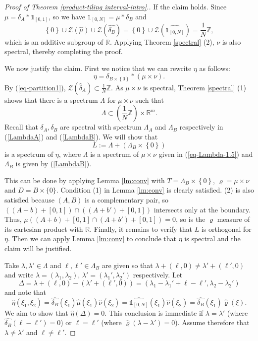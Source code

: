 \documentclass[reqno,a4paper,12pt]{amsart}
\numberwithin{equation}{section}
\newcommand{\R}{{\mathbb R}}
\newcommand{\Set}[1]{{\left\{{#1}\right\}}}
\newcommand{\RR}{{\mathbb R}}
\newcommand{\ZZ}{{\mathbb Z}}
\newcommand{\ft}[1]{\widehat{#1}}
\newcounter{rem}
\theoremstyle{remark}
\numberwithin{equation}{section}
\def\R{\mathbb{R}}
\begin{document}
{\begin{proof}[Proof of Theorem \ref{product-tiling interval-intro}.]
\noindent If the claim holds. Since $\mu = \delta_A\ast\mathds{1}_{[0, 1]}$, so we have $\mathds{1}_{[0, N]} = \mu*\delta_B$  and
$$
\Set{0} \cup \mathcal{Z}(\ft\mu) \cup \mathcal{Z}(\ft{\delta_B}) = \Set{0} \cup \mathcal{Z}(\ft{\mathds{1}_{[0, N]}}) = \frac1N\ZZ,
$$
{which is an additive subgroup of $\RR$.
Applying Theorem \ref{spectral} (2), $\nu$ is also spectral, thereby completing the proof.}


We now justify the claim. First we notice that we can rewrite $\eta$ as follows:
$$
\eta = \delta_{B\times\Set{0}}*(\mu\times\nu).
$$
By (\ref{eq-partition1}), ${\mathcal Z}(\widehat{\delta}_A) \subset \frac{1}{N}\ZZ$. As $\mu\times \nu$ is spectral,  Theorem \ref{spectral} (1) shows that   there is a spectrum $\Lambda$ for 
$\mu\times\nu$ such that  
\begin{equation}\label{eq-Lambda-1.5}
\Lambda\subset (\frac1N\ZZ) \times \RR^m.
\end{equation}
Recall that $\delta_A,\delta_B$ are spectral with spectrum $\Lambda_A$ and $\Lambda_B$ respectively in (\ref{LambdaA}) and (\ref{LambdaB}). 
We will show that
$$
L := \Lambda+(\Lambda_B\times\Set{0})
$$
is a spectrum of $\eta$, where $\Lambda$ is a spectrum of $\mu\times\nu$ given in (\ref{eq-Lambda-1.5}) and $\Lambda_B$ is given by (\ref{LambdaB}).


This can be done by applying Lemma \ref{lm:conv} with $T=\Lambda_B\times\Set{0}$, $\varrho=\mu\times\nu$ and $D=B\times\{0\}$.  Condition (1) in Lemma \ref{lm:conv} is clearly satisfied.  (2) is also satisfied because $(A,B)$ is a complementary pair, so $((A+b)+[0,1])\cap ((A+b')+[0,1])$ intersects only at the boundary. Thus, $\mu ((A+b)+[0,1]\cap (A+b')+[0,1]) = 0$, so is the  $\varrho$ measure of its cartesian product with $\R$.  Finally,   it remains to verify that $L$ is orthogonal for $\eta$. Then we can apply Lemma \ref{lm:conv} to conclude that $\eta$ is spectral and the claim will be justified. 

Take $\lambda, \lambda' \in \Lambda$ and $\ell,\ell' \in \Lambda_B$ are given so that $\lambda+(\ell,0) \neq \lambda'+ (\ell', 0)$ and write $\lambda = (\lambda_1,\lambda_2)$, $\lambda' = (\lambda_1',\lambda_2')$ respectively. Let
$$
\Delta = \lambda+(\ell,0) - (\lambda'+ (\ell', 0)) = (\lambda_1-\lambda_1'+\ell-\ell', \lambda_2-\lambda_2')
$$
and note that 
\begin{equation}\label{eta-ft}
\ft\eta(\xi_1, \xi_2) =  \ft{\delta_B}(\xi_1) \ft\mu(\xi_1)  \ft\nu(\xi_2) = \ft{\mathds{1}_{[0, N]}}(\xi_1) \ft{\nu}(\xi_2) =  \ft{\delta_B}(\xi_1) \ft\varrho(\xi).
\end{equation}
We aim to show that $\ft\eta(\Delta) = 0$. This conclusion is immediate if  $\lambda=\lambda'$ (where $\widehat{\delta_B}(\ell-\ell')=0$) or $\ell = \ell'$ (where $\widehat{\varrho} (\lambda-\lambda')=0$).  Assume therefore that $\lambda \neq \lambda'$ and $\ell \neq \ell'$.


\end{proof}}
\end{document}
